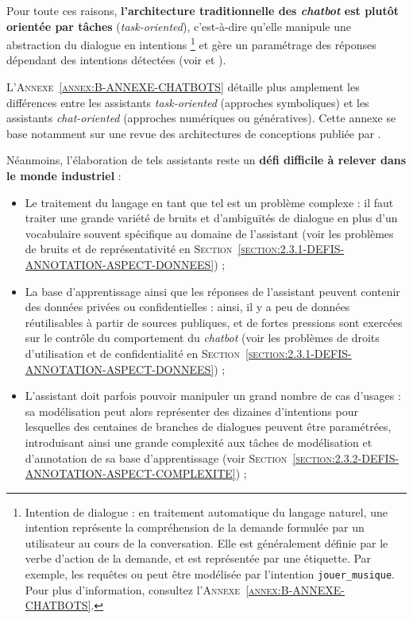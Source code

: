 	Pour toute ces raisons, \textbf{l'architecture traditionnelle des \textit{chatbot} est plutôt orientée par tâches} (\textit{task-oriented}), c'est-à-dire qu'elle manipule une abstraction du dialogue en intentions \footnote{
		Intention de dialogue : en traitement automatique du langage naturel, une intention représente la compréhension de la demande formulée par un utilisateur au cours de la conversation.
		Elle est généralement définie par le verbe d'action de la demande, et est représentée par une étiquette.
		Par exemple, les requêtes  ou  peut être modélisée par l'intention \texttt{jouer\_musique}.
		Pour plus d'information, consultez l'\textsc{Annexe~\ref{annex:B-ANNEXE-CHATBOTS}}.
	} et gère un paramétrage des réponses dépendant des intentions détectées (voir \cite{chen-etal:2017:survey-dialogue-systems} et \cite{brabra-etal:2022:dialogue-management-conversational}).
	
	\begin{leftBarInformation}
		L'\textsc{Annexe~\ref{annex:B-ANNEXE-CHATBOTS}} détaille plus amplement les différences entre les assistants \textit{task-oriented} (approches symboliques) et les assistants \textit{chat-oriented} (approches numériques ou génératives).
		Cette annexe se base notamment sur une revue des architectures de conceptions publiée par \cite{chen-etal:2017:survey-dialogue-systems}.
	\end{leftBarInformation}
	
	
	Néanmoins, l'élaboration de tels assistants reste un \textbf{défi difficile à relever dans le monde industriel} :
	\begin{itemize}
		\item Le traitement du langage en tant que tel est un problème complexe : il faut traiter une grande variété de bruits et d'ambiguïtés de dialogue en plus d'un vocabulaire souvent spécifique au domaine de l'assistant (voir les problèmes de bruits et de représentativité en \textsc{Section~\ref{section:2.3.1-DEFIS-ANNOTATION-ASPECT-DONNEES}}) ;
		\item La base d'apprentissage ainsi que les réponses de l'assistant peuvent contenir des données privées ou confidentielles : ainsi, il y a peu de données réutilisables à partir de sources publiques, et de fortes pressions sont exercées sur le contrôle du comportement du \textit{chatbot} (voir les problèmes de droits d'utilisation et de confidentialité en \textsc{Section~\ref{section:2.3.1-DEFIS-ANNOTATION-ASPECT-DONNEES}}) ;
		\item L'assistant doit parfois pouvoir manipuler un grand nombre de cas d'usages : sa modélisation peut alors représenter des dizaines d'intentions pour lesquelles des centaines de branches de dialogues peuvent être paramétrées, introduisant ainsi une grande complexité aux tâches de modélisation et d'annotation de sa base d'apprentissage (voir \textsc{Section~\ref{section:2.3.2-DEFIS-ANNOTATION-ASPECT-COMPLEXITE}}) ;
	\end{itemize}
	
